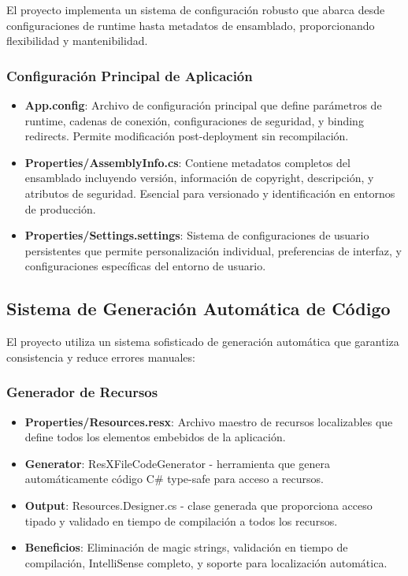 \documentclass[a4paper]{article}
\begin{document}
El proyecto implementa un sistema de configuración robusto que abarca desde configuraciones de runtime hasta metadatos de ensamblado, proporcionando flexibilidad y mantenibilidad.

\subsubsection{Configuración Principal de Aplicación}

\begin{itemize}
\item \textbf{App.config}: Archivo de configuración principal que define parámetros de runtime, cadenas de conexión, configuraciones de seguridad, y binding redirects. Permite modificación post-deployment sin recompilación.

\item \textbf{Properties/AssemblyInfo.cs}: Contiene metadatos completos del ensamblado incluyendo versión, información de copyright, descripción, y atributos de seguridad. Esencial para versionado y identificación en entornos de producción.

\item \textbf{Properties/Settings.settings}: Sistema de configuraciones de usuario persistentes que permite personalización individual, preferencias de interfaz, y configuraciones específicas del entorno de usuario.
\end{itemize}

\subsection{Sistema de Generación Automática de Código}

El proyecto utiliza un sistema sofisticado de generación automática que garantiza consistencia y reduce errores manuales:

\subsubsection{Generador de Recursos}

\begin{itemize}
\item \textbf{Properties/Resources.resx}: Archivo maestro de recursos localizables que define todos los elementos embebidos de la aplicación.

\item \textbf{Generator}: ResXFileCodeGenerator - herramienta que genera automáticamente código C\# type-safe para acceso a recursos.

\item \textbf{Output}: Resources.Designer.cs - clase generada que proporciona acceso tipado y validado en tiempo de compilación a todos los recursos.

\item \textbf{Beneficios}: Eliminación de magic strings, validación en tiempo de compilación, IntelliSense completo, y soporte para localización automática.
\end{itemize}
\end{document}
